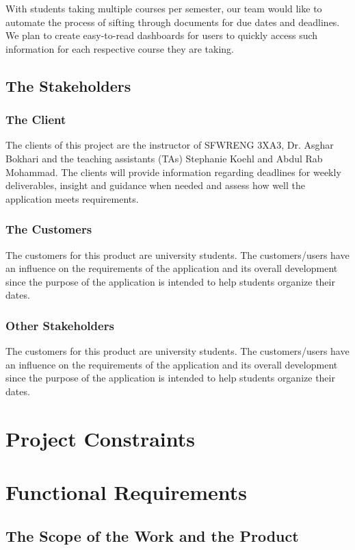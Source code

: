 \documentclass[12pt, titlepage]{article}
\begin{document}
With students taking multiple courses per semester, our team would like to automate the process of sifting through documents for due dates and deadlines. We plan to create easy-to-read dashboards for users to quickly access such information for each respective course they are taking. 

\subsection{The Stakeholders}

\subsubsection{The Client}
The clients of this project are the instructor of SFWRENG 3XA3, Dr. Asghar Bokhari and the teaching assistants (TAs) Stephanie Koehl and Abdul Rab Mohammad. The clients will provide information regarding deadlines for weekly deliverables, insight and guidance when needed and assess how well the application meets requirements.  

\subsubsection{The Customers}
The customers for this product are university students. The customers/users have an influence on the requirements of the application and its overall development since the purpose of the application is intended to help students organize their dates.  

\subsubsection{Other Stakeholders}
The customers for this product are university students. The customers/users have an influence on the requirements of the application and its overall development since the purpose of the application is intended to help students organize their dates.  

\section{Project Constraints}


\section{Functional Requirements}

\subsection{The Scope of the Work and the Product}
\end{document}
